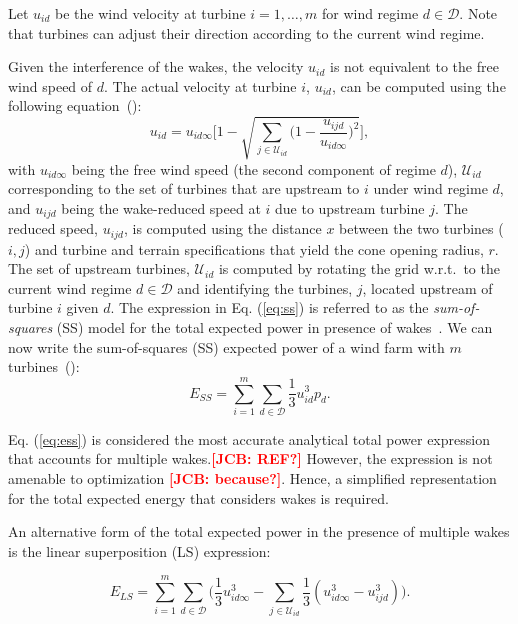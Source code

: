 \documentclass[preprint,12pt]{elsarticle}
\newcommand{\todo}[1]{{\textcolor{red}{\bf {#1}}}}
\begin{document}
Let $u_{id}$ be the wind velocity at turbine $i = 1,\ldots, m$ for wind regime $d\in\mathcal{D}$. 
Note that turbines can adjust their direction according to the current wind 
regime. 

Given the interference of the wakes, the velocity $u_{id}$ is not equivalent to the free wind speed of $d$.
The actual velocity at turbine $i$, $u_{id}$, can be computed using the following equation~(\cite{Zhang2014}):
\begin{equation}
u_{id} = u_{id\infty} \Bigg[1 - \sqrt{\sum_{j\in\mathcal{U}_{id}} \bigg( 1-\frac{u_{ijd}}{u_{id\infty}} \bigg)^2}  \Bigg], \label{eq:ss}
\end{equation} with $u_{id\infty}$ being the free wind speed (the second component of regime $d$), $\mathcal{U}_{id}$ corresponding to the set of turbines  that are upstream to $i$ 
under wind regime $d$, and $u_{ijd}$ being the wake-reduced speed at $i$ due to upstream turbine $j$. 
The reduced speed, $u_{ijd}$, is computed using the distance $x$ between the two turbines ($i,j$)  and turbine and terrain specifications that yield the cone opening radius, $r$. The set of upstream turbines, $\mathcal{U}_{id}$ is computed  
by rotating the grid w.r.t.\ to the current wind regime $d \in \mathcal{D}$ and identifying the turbines, $j$, located upstream of turbine $i$ given $d$. The expression in Eq. (\ref{eq:ss}) is referred to as the \emph{sum-of-squares} (SS) model for 
the total expected power in presence of wakes~\cite{Zhang2014}.  We can now write 
the sum-of-squares (SS) expected power of a wind farm with $m$ turbines~(\cite{Zhang2014}):
\begin{equation}
  E_{SS} = \sum_{i=1}^m \sum_{d\in\mathcal{D}} \frac{1}{3} u_{id}^3p_d.\label{eq:ess}
\end{equation}

  Eq. (\ref{eq:ess}) is considered the most accurate analytical total power expression that accounts for multiple wakes.\todo{[JCB: REF?]} However, the expression is not amenable to optimization \todo{[JCB: because?]}. Hence, a simplified representation for the total expected energy that considers wakes is required. 

An alternative 
form of the total expected power in the presence of multiple wakes is the linear superposition (LS) expression:

\begin{equation} \label{eq:ls}
E_{LS} = \sum_{i=1}^m \sum_{d\in\mathcal{D}} \Bigg(\frac{1}{3}u_{id\infty}^3 -\sum_{j\in\mathcal{U}_{id}} \frac{1}{3}(u_{id\infty}^3 - u_{ijd}^3)\Bigg).
\end{equation}
\end{document}
